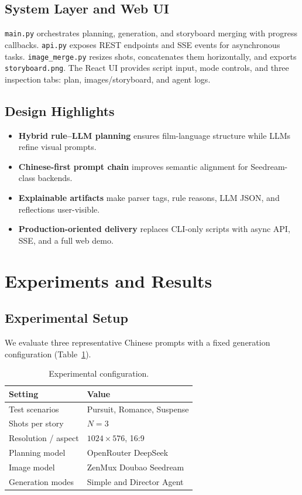 \documentclass{article}
\begin{document}
\subsection{System Layer and Web UI}
\texttt{main.py} orchestrates planning, generation, and storyboard merging with progress callbacks.
\texttt{api.py} exposes REST endpoints and SSE events for asynchronous tasks.
\texttt{image\_merge.py} resizes shots, concatenates them horizontally, and exports \texttt{storyboard.png}.
The React UI provides script input, mode controls, and three inspection tabs: plan, images/storyboard, and agent logs.

\subsection{Design Highlights}
\label{sec:innovations}
\begin{itemize}[leftmargin=*, itemsep=2pt]
  \item \textbf{Hybrid rule--LLM planning} ensures film-language structure while LLMs refine visual prompts.
  \item \textbf{Chinese-first prompt chain} improves semantic alignment for Seedream-class backends.
  \item \textbf{Explainable artifacts} make parser tags, rule reasons, LLM JSON, and reflections user-visible.
  \item \textbf{Production-oriented delivery} replaces CLI-only scripts with async API, SSE, and a full web demo.
\end{itemize}

\section{Experiments and Results}
\label{sec:experiments}

\subsection{Experimental Setup}
We evaluate three representative Chinese prompts with a fixed generation configuration (Table~\ref{tab:setup}).

\begin{table}[t]
\centering
\small
\begin{tabular}{@{}ll@{}}
\toprule
\textbf{Setting} & \textbf{Value} \\
\midrule
Test scenarios & Pursuit, Romance, Suspense \\
Shots per story & $N = 3$ \\
Resolution / aspect & $1024 \times 576$, 16:9 \\
Planning model & OpenRouter DeepSeek \\
Image model & ZenMux Doubao Seedream \\
Generation modes & Simple and Director Agent \\
\bottomrule
\end{tabular}
\caption{Experimental configuration.}
\label{tab:setup}
\end{table}
\end{document}
